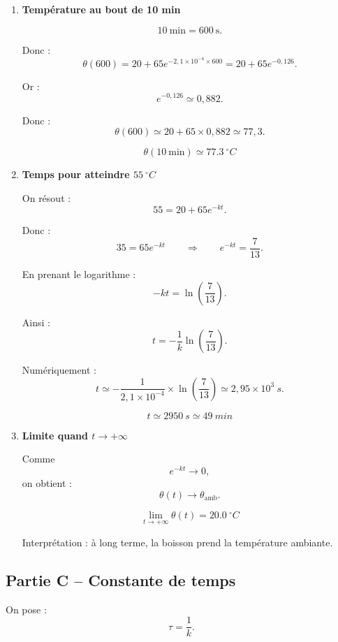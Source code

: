 \documentclass[11pt,a4paper]{article}
\begin{document}
\begin{enumerate}[label=\textbf{2.\arabic*}, resume, leftmargin=1.6em]

\item \textbf{Température au bout de 10 min}

\[
10\ \text{min} = 600\ \text{s}.
\]

Donc :
\[
\theta(600)=20+65e^{-2{,}1\times 10^{-4}\times 600}
=20+65e^{-0{,}126}.
\]

Or :
\[
e^{-0{,}126}\simeq 0{,}882.
\]

Donc :
\[
\theta(600)\simeq 20+65\times 0{,}882 \simeq 77{,}3.
\]

\[
\boxed{\theta(10\ \text{min})\simeq \SI{77,3}{^\circ C}}
\]

\item \textbf{Temps pour atteindre \(\SI{55}{^\circ C}\)}

On résout :
\[
55=20+65e^{-kt}.
\]

Donc :
\[
35=65e^{-kt}
\qquad\Longrightarrow\qquad
e^{-kt}=\frac{7}{13}.
\]

En prenant le logarithme :
\[
-kt=\ln\left(\frac{7}{13}\right).
\]

Ainsi :
\[
t=-\frac{1}{k}\ln\left(\frac{7}{13}\right).
\]

Numériquement :
\[
t\simeq -\frac{1}{2{,}1\times 10^{-4}}\times \ln\left(\frac{7}{13}\right)
\simeq 2{,}95\times 10^3\ \si{s}.
\]

\[
\boxed{t\simeq \SI{2950}{s}\simeq \SI{49}{min}}
\]

\item \textbf{Limite quand \(t\to +\infty\)}

Comme
\[
e^{-kt}\to 0,
\]
on obtient :
\[
\theta(t)\to \theta_{\mathrm{amb}}.
\]

\[
\boxed{\lim_{t\to +\infty}\theta(t)=\SI{20,0}{^\circ C}}
\]

Interprétation : à long terme, la boisson prend la température ambiante.

\end{enumerate}

\subsection*{Partie C -- Constante de temps}

On pose :
\[
\tau=\frac{1}{k}.
\]
\end{document}

